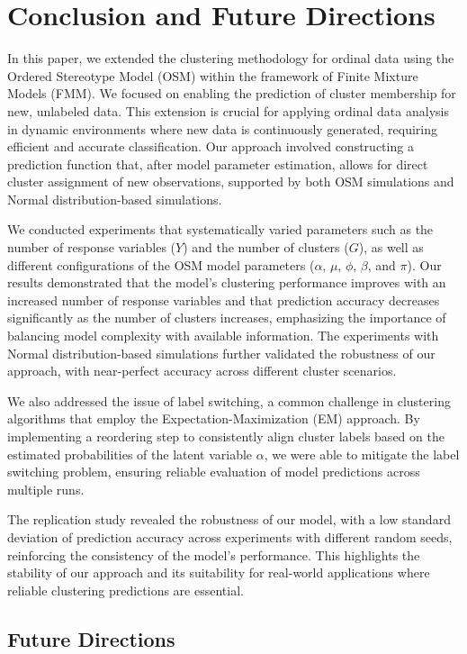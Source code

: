 \documentclass{article}
\begin{document}
\section{Conclusion and Future Directions}

In this paper, we extended the clustering methodology for ordinal data using the Ordered Stereotype Model (OSM) within the framework of Finite Mixture Models (FMM). We focused on enabling the prediction of cluster membership for new, unlabeled data. This extension is crucial for applying ordinal data analysis in dynamic environments where new data is continuously generated, requiring efficient and accurate classification. Our approach involved constructing a prediction function that, after model parameter estimation, allows for direct cluster assignment of new observations, supported by both OSM simulations and Normal distribution-based simulations.

We conducted experiments that systematically varied parameters such as the number of response variables (\( Y \)) and the number of clusters (\( G \)), as well as different configurations of the OSM model parameters (\(\alpha\), \(\mu\), \(\phi\), \(\beta\), and \(\pi\)). Our results demonstrated that the model's clustering performance improves with an increased number of response variables and that prediction accuracy decreases significantly as the number of clusters increases, emphasizing the importance of balancing model complexity with available information. The experiments with Normal distribution-based simulations further validated the robustness of our approach, with near-perfect accuracy across different cluster scenarios.

We also addressed the issue of label switching, a common challenge in clustering algorithms that employ the Expectation-Maximization (EM) approach. By implementing a reordering step to consistently align cluster labels based on the estimated probabilities of the latent variable \(\alpha\), we were able to mitigate the label switching problem, ensuring reliable evaluation of model predictions across multiple runs.

The replication study revealed the robustness of our model, with a low standard deviation of prediction accuracy across experiments with different random seeds, reinforcing the consistency of the model's performance. This highlights the stability of our approach and its suitability for real-world applications where reliable clustering predictions are essential.

\subsection{Future Directions}
\end{document}
